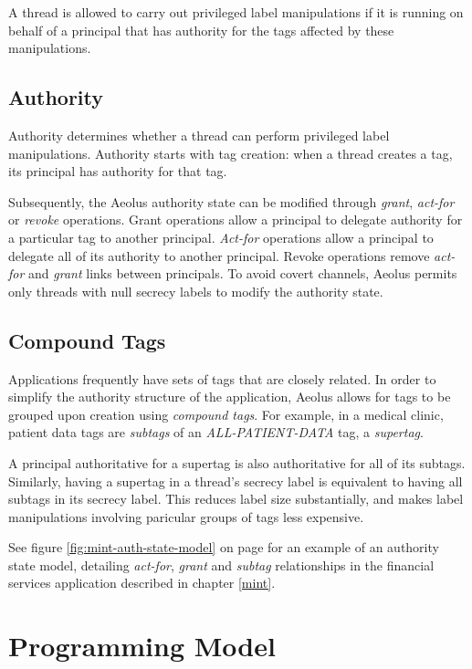 \noindent
A thread is allowed to carry out privileged label manipulations if it is running on behalf of a principal that has authority for the tags affected by these manipulations.

\subsection{Authority}\label{auth}

Authority determines whether a thread can perform privileged label manipulations. Authority starts with tag creation: when a thread creates a tag, its principal has authority for that tag.

Subsequently, the Aeolus authority state can be modified through \emph{grant}, \emph{act-for} or \emph{revoke} operations. Grant operations allow a principal to delegate authority for a particular tag to another principal. \emph{Act-for} operations allow a principal to delegate all of its authority to another principal. Revoke operations remove \emph{act-for} and \emph{grant} links between principals. To avoid covert channels, Aeolus permits only threads with null secrecy labels to modify the authority state.

\subsection{Compound Tags}

Applications frequently have sets of tags that are closely related. In order to simplify the authority structure of the application, Aeolus allows for tags to be grouped upon creation using \emph{compound tags}. For example, in a medical clinic, patient data tags are \emph{subtags} of an \emph{ALL-PATIENT-DATA} tag, a \emph{supertag}.

A principal authoritative for a supertag is also authoritative for all of its subtags. Similarly, having a supertag in a thread's secrecy label is equivalent to having all subtags in its secrecy label. This reduces label size substantially, and makes label manipulations involving paricular groups of tags less expensive.


See figure \ref{fig:mint-auth-state-model} on page \pageref{fig:mint-auth-state-model} for an example of an authority state model, detailing \emph{act-for}, \emph{grant} and \emph{subtag} relationships in the financial services application described in chapter \ref{mint}.

\section{Programming Model}

